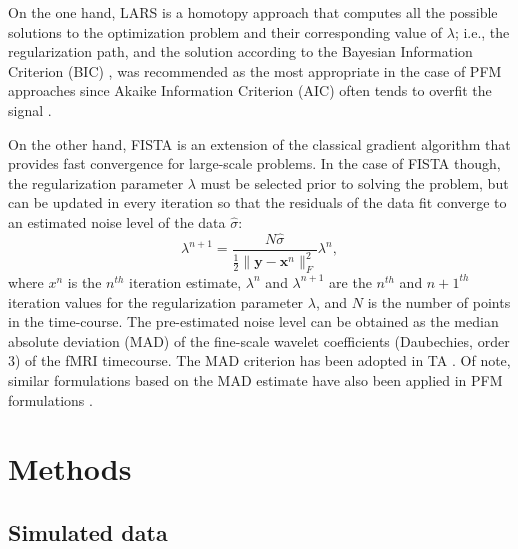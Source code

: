 On the one hand, LARS is a homotopy approach that computes all the possible
solutions to the optimization problem and their corresponding value of
$\lambda$; i.e., the regularization path, and the solution according to the
Bayesian Information Criterion (BIC)
\citep{Schwarz1978EstimatingDimensionModel}, was recommended as the most
appropriate in the case of PFM approaches since Akaike Information Criterion
(AIC) often tends to overfit the signal
\citep{Gaudes2013Paradigmfreemapping,CaballeroGaudes2019deconvolutionalgorithmmulti}.

On the other hand, FISTA is an extension of the classical gradient algorithm
that provides fast convergence for large-scale problems. In the case of FISTA
though, the regularization parameter $\lambda$ must be selected prior to solving
the problem, but can be updated in every iteration so that the residuals of the
data fit converge to an estimated noise level of the data $\hat{\sigma}$:
\begin{equation}
    \lambda^{n+1} = \frac{N \hat{\sigma}}{\frac{1}{2} \| \mathbf{y} - \mathbf{x}^n \|_F^2} \lambda^n,
\label{eq:std}
\end{equation}
where $x^n$ is the $n^{th}$ iteration estimate, $\lambda^n$ and $\lambda^{n+1}$
are the $n^{th}$ and $n+1^{th}$ iteration values for the regularization
parameter $\lambda$, and $N$ is the number of points in the time-course. The
pre-estimated noise level can be obtained as the median absolute deviation (MAD)
of the fine-scale wavelet coefficients (Daubechies, order 3) of the fMRI
timecourse. The MAD criterion has been adopted in TA
\citep{Karahanoglu2013TotalactivationfMRI}. Of note, similar formulations based
on the MAD estimate have also been applied in PFM formulations
\citep{Gaudes2012Structuredsparsedeconvolution,Gaudes2011Paradigmfreemapping}.

\section{Methods}
\label{sec:synthesis_methods}

\subsection{Simulated data}

